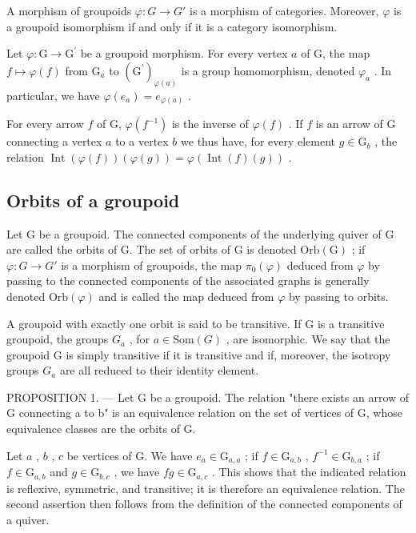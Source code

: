 A morphism of groupoids \(\varphi\colon G\to G'\) is a morphism of categories. Moreover, \(\varphi\) is a groupoid isomorphism if and only if it is a category isomorphism.

Let \(\varphi\colon\mathrm{G}\to\mathrm{G}^{\prime}\) be a groupoid morphism. For every vertex \(a\) of G, the map \(f\mapsto\varphi(f)\) from \(\mathrm{G}_{a}\) to \((\mathrm{G}^{\prime})_{\varphi(a)}\) is a group homomorphism, denoted \(\varphi_{a}\) . In particular, we have \(\varphi(e_{a})=e_{\varphi(a)}\) .

For every arrow \(f\) of G, \(\varphi(f^{-1})\) is the inverse of \(\varphi(f)\) . If \(f\) is an arrow of G connecting a vertex \(a\) to a vertex \(b\) we thus have, for every element \(g \in \mathrm{G}_b\) , the relation \(\operatorname{Int}(\varphi(f))(\varphi(g)) = \varphi(\operatorname{Int}(f)(g))\) .

\subsection{Orbits of a groupoid}

Let G be a groupoid. The connected components of the underlying quiver of G are called the orbits of G. The set of orbits of G is denoted \(\mathrm{Orb}(\mathrm{G})\) ; if \(\varphi: G \to G'\) is a morphism of groupoids, the map \(\pi_{0}(\varphi)\) deduced from \(\varphi\) by passing to the connected components of the associated graphs is generally denoted \(\mathrm{Orb}(\varphi)\) and is called the map deduced from \(\varphi\) by passing to orbits.

A groupoid with exactly one orbit is said to be transitive. If G is a transitive groupoid, the groups \(G_{a}\) , for \(a \in \text{Som}(G)\) , are isomorphic. We say that the groupoid G is simply transitive if it is transitive and if, moreover, the isotropy groups \(G_{a}\) are all reduced to their identity element.

PROPOSITION 1. --- Let G be a groupoid. The relation "there exists an arrow of G connecting a to b" is an equivalence relation on the set of vertices of G, whose equivalence classes are the orbits of G.

Let \(a\) , \(b\) , \(c\) be vertices of G. We have \(e_a \in \mathrm{G}_{a,a}\) ; if \(f \in \mathrm{G}_{a,b}\) , \(f^{-1} \in \mathrm{G}_{b,a}\) ; if \(f \in \mathrm{G}_{a,b}\) and \(g \in \mathrm{G}_{b,c}\) , we have \(fg \in \mathrm{G}_{a,c}\) . This shows that the indicated relation is reflexive, symmetric, and transitive; it is therefore an equivalence relation. The second assertion then follows from the definition of the connected components of a quiver.

